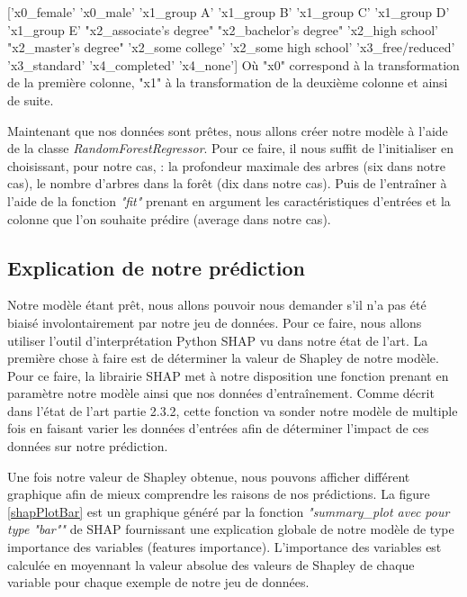 ['x0\_female' 'x0\_male' 'x1\_group A' 'x1\_group B' 'x1\_group C' 'x1\_group D' 'x1\_group E' "x2\_associate's degree" "x2\_bachelor's degree" 'x2\_high school' "x2\_master's degree" 'x2\_some college' 'x2\_some high school' 'x3\_free/reduced' 'x3\_standard' 'x4\_completed' 'x4\_none']\medbreak
Où "x0" correspond à la transformation de la première colonne, "x1" à la transformation de la deuxième colonne et ainsi de suite.\par
Maintenant que nos données sont prêtes, nous allons créer notre modèle à l'aide de la classe \textit{RandomForestRegressor}. Pour ce faire, il nous suffit de l'initialiser en choisissant, pour notre cas, : la profondeur maximale des arbres (six dans notre cas), le nombre d'arbres dans la forêt (dix dans notre cas). Puis de l'entraîner à l'aide de la fonction \textit{"fit"} prenant en argument les caractéristiques d'entrées et la colonne que l'on souhaite prédire (average dans notre cas).

\subsection{Explication de notre prédiction}
Notre modèle étant prêt, nous allons pouvoir nous demander s'il n'a pas été biaisé involontairement par notre jeu de données. Pour ce faire, nous allons utiliser l'outil d'interprétation Python SHAP vu dans notre état de l'art. La première chose à faire est de déterminer la valeur de Shapley de notre modèle. Pour ce faire, la librairie SHAP met à notre disposition une fonction prenant en paramètre notre modèle ainsi que nos données d'entraînement. Comme décrit dans l'état de l'art partie 2.3.2, cette fonction va sonder notre modèle de multiple fois en faisant varier les données d'entrées afin de déterminer l'impact de ces données sur notre prédiction.\par
Une fois notre valeur de Shapley obtenue, nous pouvons afficher différent graphique afin de mieux comprendre les raisons de nos prédictions. La figure \ref{shapPlotBar} est un graphique généré par la fonction \textit{"summary\_plot avec pour type "bar""} de SHAP fournissant une explication globale de notre modèle de type importance des variables (features importance). L’importance des variables est calculée en moyennant la valeur absolue des valeurs de Shapley de chaque variable pour chaque exemple de notre jeu de données.

